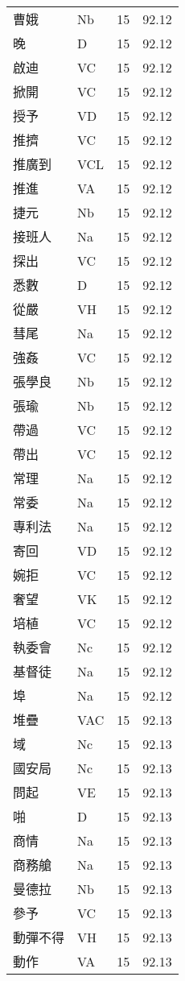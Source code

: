 \documentclass[twocolumn]{book}
\begin{document}
\begin{supertabular}{llrr}
曹娥 & Nb & 15 &  92.12\\
晚 & D & 15 &  92.12\\
啟迪 & VC & 15 &  92.12\\
掀開 & VC & 15 &  92.12\\
授予 & VD & 15 &  92.12\\
推擠 & VC & 15 &  92.12\\
推廣到 & VCL & 15 &  92.12\\
推進 & VA & 15 &  92.12\\
捷元 & Nb & 15 &  92.12\\
接班人 & Na & 15 &  92.12\\
探出 & VC & 15 &  92.12\\
悉數 & D & 15 &  92.12\\
從嚴 & VH & 15 &  92.12\\
彗尾 & Na & 15 &  92.12\\
強姦 & VC & 15 &  92.12\\
張學良 & Nb & 15 &  92.12\\
張瑜 & Nb & 15 &  92.12\\
帶過 & VC & 15 &  92.12\\
帶出 & VC & 15 &  92.12\\
常理 & Na & 15 &  92.12\\
常委 & Na & 15 &  92.12\\
專利法 & Na & 15 &  92.12\\
寄回 & VD & 15 &  92.12\\
婉拒 & VC & 15 &  92.12\\
奢望 & VK & 15 &  92.12\\
培植 & VC & 15 &  92.12\\
執委會 & Nc & 15 &  92.12\\
基督徒 & Na & 15 &  92.12\\
埠 & Na & 15 &  92.12\\
堆疊 & VAC & 15 &  92.13\\
域 & Nc & 15 &  92.13\\
國安局 & Nc & 15 &  92.13\\
問起 & VE & 15 &  92.13\\
啪 & D & 15 &  92.13\\
商情 & Na & 15 &  92.13\\
商務艙 & Na & 15 &  92.13\\
曼德拉 & Nb & 15 &  92.13\\
參予 & VC & 15 &  92.13\\
動彈不得 & VH & 15 &  92.13\\
動作 & VA & 15 &  92.13\\

\end{supertabular}
\end{document}
